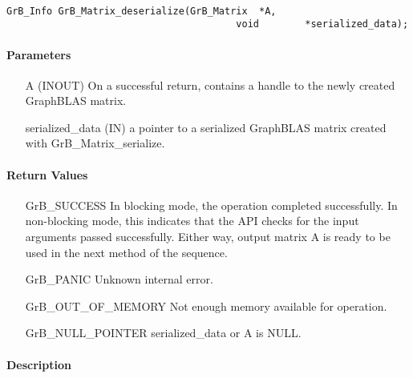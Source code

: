 \paragraph{\syntax}

\begin{Verbatim}[samepage=true]
        GrB_Info GrB_Matrix_deserialize(GrB_Matrix  *A,
                                        void        *serialized_data);
\end{Verbatim}

\paragraph{Parameters}

\begin{itemize}[leftmargin=1.1in]
    \item[{\sf A}]      ({\sf INOUT}) On a successful return, contains a handle to the newly created GraphBLAS matrix.
    \item[{\sf serialized\_data}] ({\sf IN}) a pointer to a serialized GraphBLAS matrix created with {\sf GrB\_Matrix\_serialize}.
\end{itemize}
\paragraph{Return Values}

\begin{itemize}[leftmargin=2.3in]
    \item[{\sf GrB\_SUCCESS}]         In blocking mode, the operation completed
    successfully. In non-blocking mode, this indicates that the API checks 
    for the input arguments passed successfully. Either way, output matrix 
    {\sf A} is ready to be used in the next method of the sequence.

    \item[{\sf GrB\_PANIC}]           Unknown internal error.
    
    \item[{\sf GrB\_OUT\_OF\_MEMORY}] Not enough memory available for operation.
    
    \item[{\sf GrB\_NULL\_POINTER}]  {\sf serialized\_data} or {\sf A} is {\sf NULL}.
\end{itemize}

\paragraph{Description}


